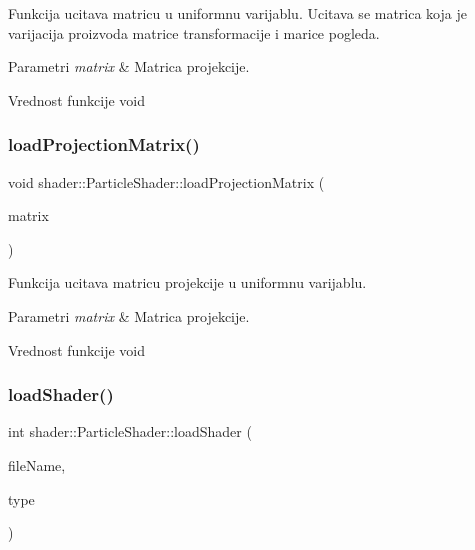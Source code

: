 Funkcija ucitava matricu u uniformnu varijablu. Ucitava se matrica koja je varijacija proizvoda matrice transformacije i marice pogleda. 


\begin{DoxyParams}{Parametri}
{\em matrix} & Matrica projekcije. \\
\hline
\end{DoxyParams}
\begin{DoxyReturn}{Vrednost funkcije}
void 
\end{DoxyReturn}
\mbox{\label{classshader_1_1ParticleShader_a2ff33e55d9eed630496a7e80fa5a3015}} 
\subsubsection{\texorpdfstring{load\+Projection\+Matrix()}{loadProjectionMatrix()}}
{\footnotesize\ttfamily void shader\+::\+Particle\+Shader\+::load\+Projection\+Matrix (\begin{DoxyParamCaption}\item[{mat4}]{matrix }\end{DoxyParamCaption})}



Funkcija ucitava matricu projekcije u uniformnu varijablu. 


\begin{DoxyParams}{Parametri}
{\em matrix} & Matrica projekcije. \\
\hline
\end{DoxyParams}
\begin{DoxyReturn}{Vrednost funkcije}
void 
\end{DoxyReturn}
\mbox{\label{classshader_1_1ParticleShader_a444f88cdbece44ab06d85f252e687002}} 
\subsubsection{\texorpdfstring{load\+Shader()}{loadShader()}}
{\footnotesize\ttfamily int shader\+::\+Particle\+Shader\+::load\+Shader (\begin{DoxyParamCaption}\item[{const char $\ast$}]{file\+Name,  }\item[{G\+Lenum}]{type }\end{DoxyParamCaption})\hspace{0.3cm}{\ttfamily [private]}}



